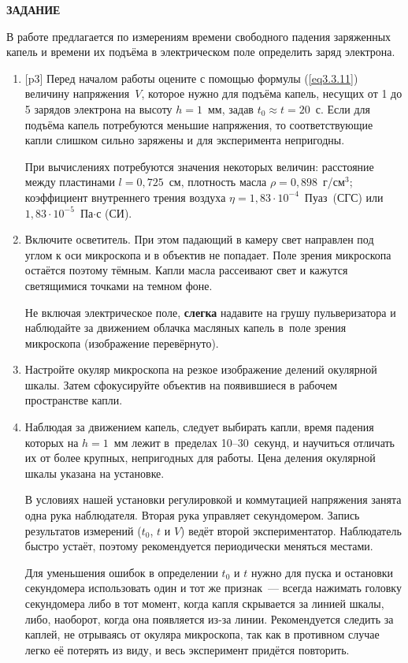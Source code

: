 {\Large \bf ЗАДАНИЕ}

В работе предлагается по измерениям времени свободного падения заряженных капель и времени их подъёма в электрическом поле определить заряд электрона.

\begin{enumerate}

\item{[p3] Перед началом работы оцените с помощью формулы (\ref{eq3.3.11}) величину напряжения~$V$, которое нужно для подъёма капель, несущих от 1 до 5 зарядов электрона на высоту $h=1$~мм, задав $t_0\approx t=20$~с. Если для подъёма капель потребуются меньшие напряжения, то соответствующие капли слишком сильно заряжены и для эксперимента непригодны.

При вычислениях потребуются значения некоторых величин: расстояние между пластинами $l=0,725$~см, плотность масла
$\rho=0,898$~г/см$^3$; коэффициент внутреннего трения воздуха $\eta=1,83\cdot 10^{-4}$~Пуаз~(СГС) или $1,83\cdot 10^{-5}$~Па$\cdot$с
(СИ).}

\item{ Включите осветитель. При этом падающий в камеру свет направлен под углом к оси микроскопа и в объектив не попадает. Поле зрения микроскопа остаётся поэтому тёмным. Капли масла рассеивают свет и кажутся светящимися точками на темном фоне.

Не включая электрическое поле, {\bf слегка} надавите на грушу пульверизатора  и наблюдайте за движением облачка масляных капель в~поле зрения микроскопа (изображение перевёрнуто).}

\item{ Настройте окуляр микроскопа на резкое изображение делений окулярной шкалы. Затем сфокусируйте объектив на появившиеся в рабочем пространстве капли.}

\item{ Наблюдая за движением капель, следует выбирать капли, время падения которых на $h=1$~мм лежит в~пределах
10--30~секунд, и научиться отличать их от более крупных, непригодных для работы. Цена деления окулярной шкалы указана на установке.

В условиях нашей установки регулировкой и коммутацией напряжения занята одна рука наблюдателя. Вторая рука управляет секундомером. Запись результатов измерений ($t_0$, $t$ и $V$) ведёт второй экспериментатор. Наблюдатель быстро устаёт, поэтому рекомендуется периодически меняться местами.

Для уменьшения ошибок в определении $t_0$ и $t$ нужно для пуска и остановки секундомера использовать один и тот же признак~--- всегда нажимать головку секундомера либо в тот момент, когда капля скрывается за линией шкалы, либо, наоборот, когда она появляется из-за линии. Рекомендуется следить за каплей, не отрываясь от окуляра микроскопа, так как в противном случае легко её потерять из виду, и весь эксперимент придётся повторить.}


\end{enumerate}
